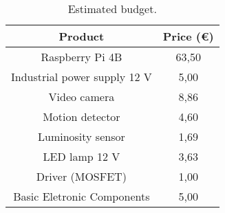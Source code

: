 \begin{table}[ht]
	\centering
	
	\begin{tabular}{||c | c||} 
		\hline
		Product & Price (€)\\
		\hline\hline
		Raspberry Pi 4B & 63,50\\\hline
		Industrial power supply 12 V & 5,00\\\hline
		Video camera & 8,86\\\hline
		Motion detector & 4,60\\\hline
		Luminosity sensor & 1,69\\\hline
		LED lamp 12 V & 3,63\\\hline
		Driver (MOSFET) & 1,00\\\hline
		Basic Eletronic Components & 5,00
		\\\hline
	\end{tabular}
	\caption{Estimated budget.}
	\label{table:data}
\end{table}